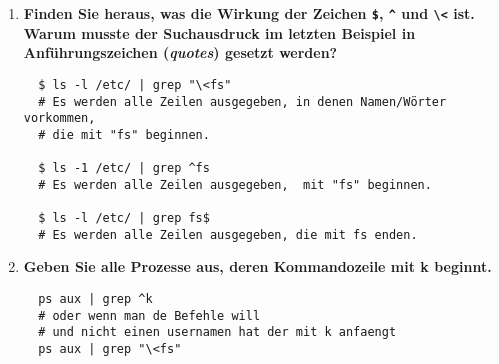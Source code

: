 \documentclass[
   draft=false
  ,paper=a4
  ,twoside=false
  ,fontsize=11pt
  ,headsepline
  ,BCOR10mm
  ,DIV11
]{scrartcl} %
\begin{document}
\begin{enumerate}
  \item \textbf{Finden Sie heraus, was die Wirkung der Zeichen \texttt{\$},
  \texttt{\^{}} und \texttt{\textbackslash <} ist. Warum musste der
  Suchausdruck im letzten Beispiel in Anführungszeichen (\emph{quotes})
  gesetzt werden?}\\
  \begin{verbatim}
  $ ls -l /etc/ | grep "\<fs"
  # Es werden alle Zeilen ausgegeben, in denen Namen/Wörter vorkommen,
  # die mit "fs" beginnen.

  $ ls -1 /etc/ | grep ^fs
  # Es werden alle Zeilen ausgegeben,  mit "fs" beginnen.

  $ ls -l /etc/ | grep fs$
  # Es werden alle Zeilen ausgegeben, die mit fs enden.
  \end{verbatim}

  \item \textbf{Geben Sie alle Prozesse aus, deren Kommandozeile mit k
  beginnt.}\\
  \begin{verbatim}
  ps aux | grep ^k
  # oder wenn man de Befehle will
  # und nicht einen usernamen hat der mit k anfaengt
  ps aux | grep "\<fs"
  \end{verbatim}
\end{enumerate}
\end{document}
